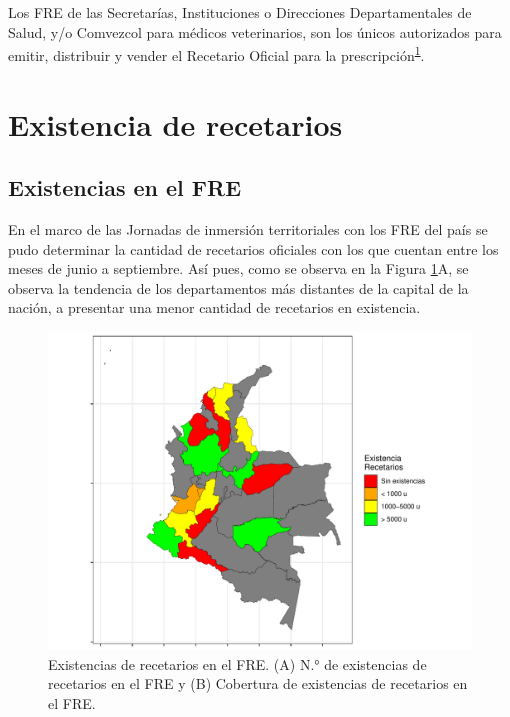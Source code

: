 \documentclass[
]{book}
\begin{document}
Los FRE de las Secretarías, Instituciones o Direcciones Departamentales de Salud, y/o Comvezcol para médicos veterinarios, son los únicos autorizados para emitir, distribuir y vender el Recetario Oficial para la prescripción\textsuperscript{\protect\hyperlink{ref-MSPS1478-2006}{1}}.

\hypertarget{existencia-de-recetarios}{%
\section{Existencia de recetarios}\label{existencia-de-recetarios}}

\hypertarget{existencias-en-el-fre}{%
\subsection{Existencias en el FRE}\label{existencias-en-el-fre}}

En el marco de las Jornadas de inmersión territoriales con los FRE del país se pudo determinar la cantidad de recetarios oficiales con los que cuentan entre los meses de junio a septiembre. Así pues, como se observa en la Figura \ref{fig:existenciasRecetarios}A, se observa la tendencia de los departamentos más distantes de la capital de la nación, a presentar una menor cantidad de recetarios en existencia.

\begin{figure}

{\centering \includegraphics[width=1\linewidth]{InformeFinal_files/figure-latex/existenciasRecetarios-1} 

}

\caption{Existencias de recetarios en el FRE. (A) N.° de existencias de recetarios en el FRE y (B) Cobertura de existencias de recetarios en el FRE.}\label{fig:existenciasRecetarios}
\end{figure}
\end{document}
